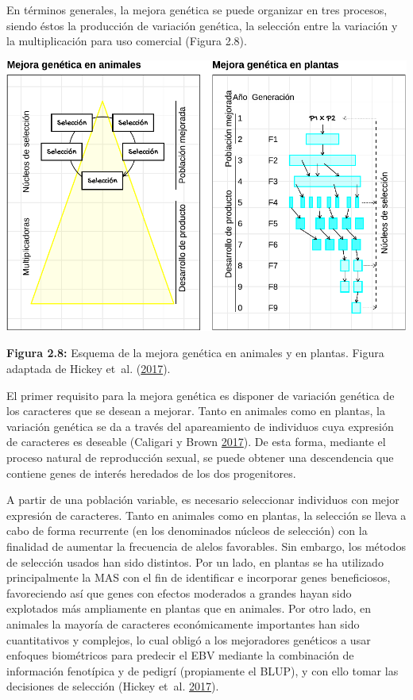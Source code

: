 \documentclass[11pt,spanish,a4paper,oneside,]{book} %
\begin{document}
En términos generales, la mejora genética se puede organizar en tres procesos, siendo éstos la producción de variación genética, la selección entre la variación y la multiplicación para uso comercial (Figura 2.8).

\begin{center}\includegraphics[width=1\linewidth]{figures/Mej_Anim_Plan} \end{center}

\textbf{Figura 2.8:} Esquema de la mejora genética en animales y en plantas. Figura adaptada de Hickey et~al. (\protect\hyperlink{ref-cite:44}{2017}).

El primer requisito para la mejora genética es disponer de variación genética de los caracteres que se desean a mejorar. Tanto en animales como en plantas, la variación genética se da a través del apareamiento de individuos cuya expresión de caracteres es deseable (Caligari y Brown \protect\hyperlink{ref-cite:42}{2017}). De esta forma, mediante el proceso natural de reproducción sexual, se puede obtener una descendencia que contiene genes de interés heredados de los dos progenitores.

A partir de una población variable, es necesario seleccionar individuos con mejor expresión de caracteres. Tanto en animales como en plantas, la selección se lleva a cabo de forma recurrente (en los denominados núcleos de selección) con la finalidad de aumentar la frecuencia de alelos favorables. Sin embargo, los métodos de selección usados han sido distintos. Por un lado, en plantas se ha utilizado principalmente la MAS con el fin de identificar e incorporar genes beneficiosos, favoreciendo así que genes con efectos moderados a grandes hayan sido explotados más ampliamente en plantas que en animales. Por otro lado, en animales la mayoría de caracteres económicamente importantes han sido cuantitativos y complejos, lo cual obligó a los mejoradores genéticos a usar enfoques biométricos para predecir el EBV mediante la combinación de información fenotípica y de pedigrí (propiamente el BLUP), y con ello tomar las decisiones de selección (Hickey et~al. \protect\hyperlink{ref-cite:44}{2017}).
\end{document}
